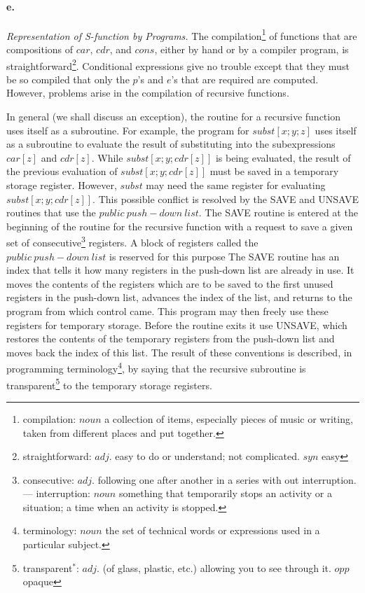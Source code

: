 \documentclass[11pt, a4paper]{article}
\begin{document}
\paragraph{e.}\textit{Representation of S-function by Programs.}
The
compilation\footnote{compilation: $noun$ a collection of items, especially
  pieces of music or writing, taken from different places and put together.}
of functions that are compositions of $car$, $cdr$, and $cons$,
either by hand or by a compiler program, is
straightforward\footnote{straightforward: $adj.$ easy to do or understand; not
  complicated. $syn$ easy}.
Conditional
expressions give no trouble except that they must be so compiled that only the
$p$'s and $e$'s that are required are computed. However, problems arise in the
compilation of recursive functions.

In general (we shall discuss an exception), the routine for a recursive function
uses itself as a subroutine. For example, the program for $subst[x; y; z]$ uses
itself as a subroutine to evaluate the result of substituting into the
subexpressions $car[z]$ and $cdr[z]$. While $subst[x; y; cdr[z]]$ is being
evaluated, the result of the previous evaluation of $subst[x; y; cdr[z]]$ must
be saved in a temporary storage register. However, $subst$ may need the same
register for evaluating $subst[x; y; cdr[z]]$. This possible conflict is
resolved by the SAVE and UNSAVE routines that use the $public \ push-down
\ list$. The SAVE routine is entered at the beginning of the routine for the
recursive function with a request to save a given set of
consecutive\footnote{consecutive: $adj.$ following one after another in a series
  with out interruption. --- interruption: $noun$ something that temporarily
  stops an activity or a situation; a time when an activity is stopped.}
registers. A block of registers called the $public \ push-down \ list$ is
reserved for this purpose The SAVE routine has an index that tells it how many
registers in the push-down list are already in use. It moves the contents of the
registers which are to be saved to the first unused registers in the push-down
list, advances the index of the list, and returns to the program from which
control came. This program may then freely use these registers for temporary
storage. Before the routine exits it use UNSAVE, which restores the contents of
the temporary registers from the push-down list and moves back the index of this
list. The result of these conventions is described, in programming
terminology\footnote{terminology: $noun$ the set of technical words or
  expressions used in a particular subject.},
by saying that the recursive subroutine is
transparent\footnote{transparent$^*$: $adj.$ (of glass, plastic, etc.) allowing
  you to see through it. $opp$ opaque}
to the temporary storage
registers.
\end{document}

